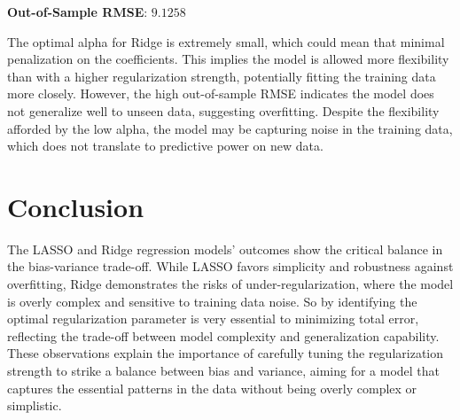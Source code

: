 \documentclass[12pt]{article}
\begin{document}
\textbf{Out-of-Sample RMSE}: \(9.1258\)

The optimal alpha for Ridge is extremely small, which could mean that minimal penalization on the coefficients. This implies the model is allowed more flexibility than with a higher regularization strength, potentially fitting the training data more closely. However, the high out-of-sample RMSE indicates the model does not generalize well to unseen data, suggesting overfitting. Despite the flexibility afforded by the low alpha, the model may be capturing noise in the training data, which does not translate to predictive power on new data.

\section{Conclusion}

The LASSO and Ridge regression models' outcomes show the critical balance in the bias-variance trade-off. While LASSO favors simplicity and robustness against overfitting, Ridge demonstrates the risks of under-regularization, where the model is overly complex and sensitive to training data noise. So by identifying the optimal regularization parameter is very essential to minimizing total error, reflecting the trade-off between model complexity and generalization capability. These observations explain the importance of carefully tuning the regularization strength to strike a balance between bias and variance, aiming for a model that captures the essential patterns in the data without being overly complex or simplistic.
\end{document}
